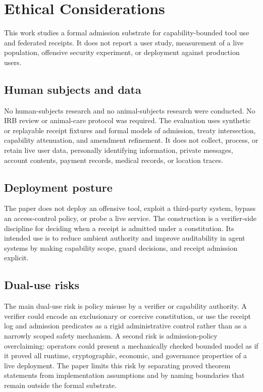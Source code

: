 \section{Ethical Considerations}
\label{sec:ethical-considerations}

This work studies a formal admission substrate for capability-bounded
tool use and federated receipts. It does not report a user study,
measurement of a live population, offensive security experiment, or
deployment against production users.

\subsection{Human subjects and data}
\label{sec:ethical-considerations:subjects}

No human-subjects research and no animal-subjects research were
conducted. No IRB review or animal-care protocol was required. The
evaluation uses synthetic or replayable receipt fixtures and formal
models of admission, treaty intersection, capability attenuation, and
amendment refinement. It does not collect, process, or retain live user
data, personally identifying information, private messages, account
contents, payment records, medical records, or location traces.

\subsection{Deployment posture}
\label{sec:ethical-considerations:deployment}

The paper does not deploy an offensive tool, exploit a third-party
system, bypass an access-control policy, or probe a live service. The
construction is a verifier-side discipline for deciding when a receipt
is admitted under a constitution. Its intended use is to reduce
ambient authority and improve auditability in agent systems by making
capability scope, guard decisions, and receipt admission explicit.

\subsection{Dual-use risks}
\label{sec:ethical-considerations:dual-use}

The main dual-use risk is policy misuse by a verifier or capability
authority. A verifier could encode an exclusionary or coercive
constitution, or use the receipt log and admission predicates as a
rigid administrative control rather than as a narrowly scoped safety
mechanism. A second risk is admission-policy overclaiming: operators
could present a mechanically checked bounded model as if it proved all
runtime, cryptographic, economic, and governance properties of a live
deployment. The paper limits this risk by separating proved theorem
statements from implementation assumptions and by naming boundaries
that remain outside the formal substrate.

